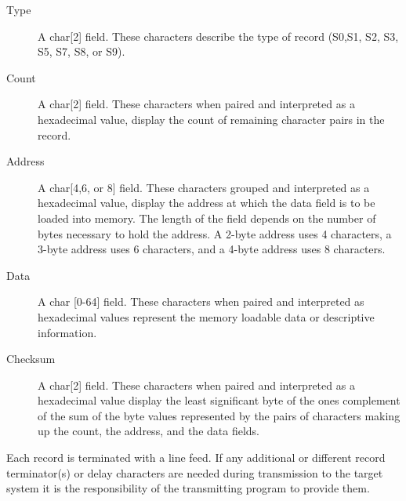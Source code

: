             \begin{description}
                \item[Type] A char[2] field. These characters describe the type of record (S0,S1, S2, S3, S5, S7, S8, or S9).

                \item[Count] A char[2] field. These characters when paired and interpreted as a hexadecimal value, display the count of remaining character pairs in the record.

                \item[Address]
                    A char[4,6, or 8] field. These characters grouped and interpreted
                    as a hexadecimal value, display the address at which the data field
                    is to be loaded into memory. The length of the field depends on the
                    number of bytes necessary to hold the address. A 2-byte address
                    uses 4 characters, a 3-byte address uses 6 characters, and a 4-byte
                    address uses 8 characters.

                \item[Data]
                    A char [0-64] field. These characters when paired and interpreted
                    as hexadecimal values represent the memory loadable data or
                    descriptive information.

                \item[Checksum]
                    A char[2] field. These characters when paired and interpreted as a
                    hexadecimal value display the least significant byte of the ones
                    complement of the sum of the byte values represented by the pairs
                    of characters making up the count, the address, and the data
                    fields.
            \end{description}

            Each record is terminated with a line feed. If any additional or
            different record terminator(s) or delay characters are needed during
            transmission to the target system it is the responsibility of the
            transmitting program to provide them.

